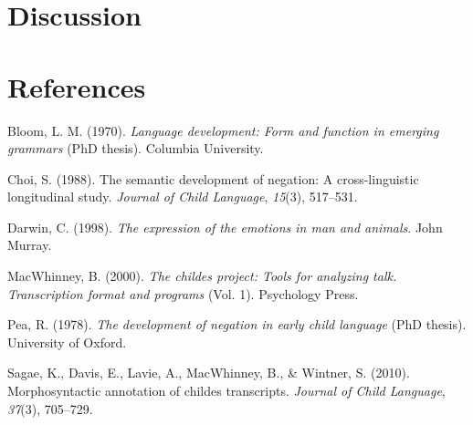 \documentclass[10pt, letterpaper]{article}
\begin{document}
\hypertarget{discussion}{%
\section{Discussion}\label{discussion}}

\hypertarget{references}{%
\section{References}\label{references}}

\setlength{\parindent}{-0.1in} 
\setlength{\leftskip}{0.125in}

\noindent

\hypertarget{refs}{}
\leavevmode\hypertarget{ref-bloom1970language}{}%
Bloom, L. M. (1970). \emph{Language development: Form and function in
emerging grammars} (PhD thesis). Columbia University.

\leavevmode\hypertarget{ref-choi1988semantic}{}%
Choi, S. (1988). The semantic development of negation: A
cross-linguistic longitudinal study. \emph{Journal of Child Language},
\emph{15}(3), 517--531.

\leavevmode\hypertarget{ref-darwin1872expression}{}%
Darwin, C. (1998). \emph{The expression of the emotions in man and
animals}. John Murray.

\leavevmode\hypertarget{ref-macwhinney2000childes}{}%
MacWhinney, B. (2000). \emph{The childes project: Tools for analyzing
talk. Transcription format and programs} (Vol. 1). Psychology Press.

\leavevmode\hypertarget{ref-pea1978}{}%
Pea, R. (1978). \emph{The development of negation in early child
language} (PhD thesis). University of Oxford.

\leavevmode\hypertarget{ref-sagae2010morphosyntactic}{}%
Sagae, K., Davis, E., Lavie, A., MacWhinney, B., \& Wintner, S. (2010).
Morphosyntactic annotation of childes transcripts. \emph{Journal of
Child Language}, \emph{37}(3), 705--729.


\end{document}
